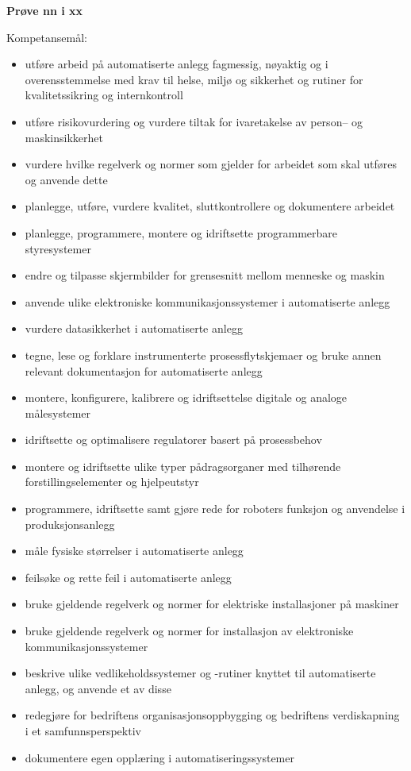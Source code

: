 
\centerline\textbf{Prøve nn  i xx }  \bigskip

Kompetansemål:
\begin{itemize}[noitemsep]
\item utføre arbeid på automatiserte anlegg fagmessig, nøyaktig og i overensstemmelse med krav til helse, miljø og sikkerhet og rutiner for kvalitetssikring og internkontroll
\item utføre risikovurdering og vurdere tiltak for ivaretakelse av person– og maskinsikkerhet
\item vurdere hvilke regelverk og normer som gjelder for arbeidet som skal utføres og anvende dette
\item planlegge, utføre, vurdere kvalitet, sluttkontrollere og dokumentere arbeidet
\item planlegge, programmere, montere og idriftsette programmerbare styresystemer
\item endre og tilpasse skjermbilder for grensesnitt mellom menneske og maskin
\item anvende ulike elektroniske kommunikasjonssystemer i automatiserte anlegg
\item vurdere datasikkerhet i automatiserte anlegg
\item tegne, lese og forklare instrumenterte prosessflytskjemaer og bruke annen relevant dokumentasjon for automatiserte anlegg
\item montere, konfigurere, kalibrere og idriftsettelse digitale og analoge målesystemer
\item idriftsette og optimalisere regulatorer basert på prosessbehov
\item montere og idriftsette ulike typer pådragsorganer med tilhørende forstillingselementer og hjelpeutstyr
\item programmere, idriftsette samt gjøre rede for roboters funksjon og anvendelse i produksjonsanlegg
\item måle fysiske størrelser i automatiserte anlegg
\item feilsøke og rette feil i automatiserte anlegg
\item bruke gjeldende regelverk og normer for elektriske installasjoner på maskiner
\item bruke gjeldende regelverk og normer for installasjon av elektroniske kommunikasjonssystemer
\item beskrive ulike vedlikeholdssystemer og -rutiner knyttet til automatiserte anlegg, og anvende et av disse
\item redegjøre for bedriftens organisasjonsoppbygging og bedriftens verdiskapning i et samfunnsperspektiv
\item dokumentere egen opplæring i automatiseringssystemer
\end{itemize}

